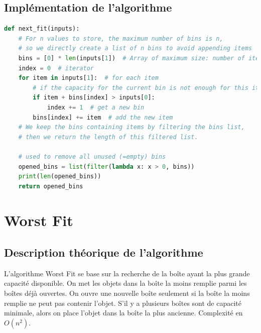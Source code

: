 \documentclass{article}
\begin{document}
\subsection{Implémentation de l'algorithme}
\begin{lstlisting}[language=Python, frame=single]
def next_fit(inputs):
    # For n values to store, the maximum number of bins is n,
    # so we directly create a list of n bins to avoid appending items
    bins = [0] * len(inputs[1])  # Array of maximum size: number of items
    index = 0  # iterator
    for item in inputs[1]:  # for each item
        # if the capacity for the current bin is not enough for this item
        if item + bins[index] > inputs[0]:
            index += 1  # get a new bin
        bins[index] += item  # add the new item
    # We keep the bins containing items by filtering the bins list,
    # then we return the length of this filtered list.

    # used to remove all unused (=empty) bins
    opened_bins = list(filter(lambda x: x > 0, bins))
    print(len(opened_bins))
    return opened_bins
\end{lstlisting}



\section{Worst Fit}

\subsection{Description théorique de l'algorithme}
L'algorithme Worst Fit se base sur la recherche de la boîte ayant la plus grande capacité disponible.
On met les objets dans la boîte la moins remplie parmi les boîtes déjà ouvertes.
On ouvre une nouvelle boîte seulement si la boîte la moins remplie ne peut pas contenir l'objet.
S'il y a plusieurs boîtes sont de capacité minimale, alors on place l'objet dans la boîte la plus ancienne.
Complexité en $O(n^2)$.
\end{document}
